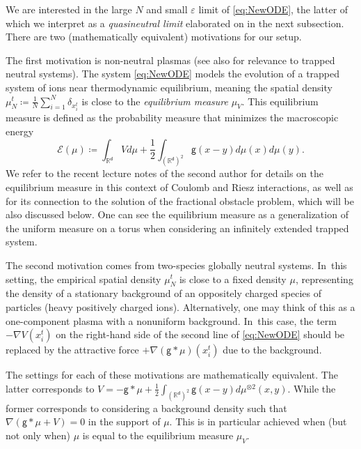 \documentclass[JEP,XML,SOM,Unicode,published]{cedram}
\theoremstyle{plain}
\theoremstyle{definition}
\newcommand{\R}{{\mathbb{R}}}
\let\vep\varepsilon
\let\nab\nabla
\renewcommand{\d}{\mathsf{d}}
\newcommand{\g}{{\mathsf{g}}}
\begin{document}
{We are interested in the large $N$ and small $\vep$ limit of \eqref{eq:NewODE}, the latter of which we interpret as a \emph{quasineutral limit} elaborated on in the next subsection. There are two (mathematically equivalent) motivations for our setup.

The first motivation is non-neutral plasmas \cite{OD1998} (see also \cite{WBIP1985,MKTL2008} for relevance to trapped neutral systems). The system \eqref{eq:NewODE} models the evolution of a trapped system of ions near thermodynamic equilibrium, meaning the spatial density $\mu_N^t \coloneqq \frac1N\sum_{i=1}^N\delta_{x_i^t}$ is close to the \emph{equilibrium measure} $\mu_V$. This equilibrium measure is defined as
the probability measure that minimizes the {macroscopic} energy
\begin{equation}\label{eq:Edef}
\mathcal{E}(\mu) \coloneqq \int_{\R^\d}Vd\mu + \frac{1}{2}\int_{(\R^\d)^{ 2}}\g(x-y)d\mu(x) d\mu(y).
\end{equation}
We refer to the recent lecture notes of the second author \cite[Chap.\,2]{SerfatyLN} for details on the equilibrium measure in this context of Coulomb and Riesz interactions, as well as for its connection to the solution of the fractional obstacle problem, which will be also discussed below.
One can see the equilibrium measure as a generalization of the uniform measure on a torus when considering an infinitely extended trapped system.

The second motivation comes from two-species globally neutral systems. In~this setting, the empirical spatial density $\mu_N^t$ is close to a fixed density $\mu$, representing the density of a stationary background of an oppositely charged species of particles (\eg heavy positively charged ions). Alternatively, one may think of this as a one-component plasma with a nonuniform background. In~this case, the term $-\nab V(x_i^t)$ on the right-hand side of the second line of \eqref{eq:NewODE} should be replaced by the attractive force $+\nab(\g\ast\mu)(x_i^t)$ due to the background.

The settings for each of these motivations are mathematically equivalent. The latter corresponds to $V = -\g\ast\mu + \frac12\int_{(\R^\d)^2}\g(x-y)d\mu^{\otimes 2}(x,y)$. While the former corresponds to considering a background density such that $\nabla(\g\ast\mu+V)=0$ in the support of $\mu$. This is in particular achieved when (but not only when) $\mu$ is equal to the equilibrium measure $\mu_V$.
}
\end{document}
